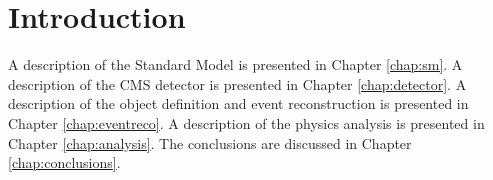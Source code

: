 \chapter{Introduction}

A description of the Standard Model is presented in Chapter \ref{chap:sm}. A description of the CMS detector is presented in Chapter \ref{chap:detector}. A description of the object definition and event reconstruction is presented in Chapter \ref{chap:eventreco}.  A description of the physics analysis is presented in Chapter \ref{chap:analysis}. The conclusions are discussed in Chapter \ref{chap:conclusions}.
